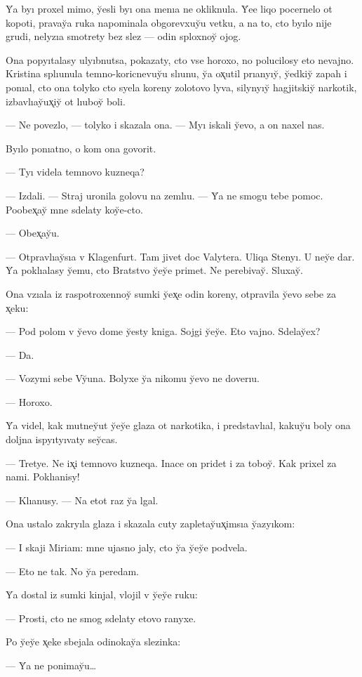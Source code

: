 \documentclass[10pt]{book}
\begin{document}
Y̆a byı proxel mimo, y̆esli byı ona menıa ne okliknula. Y̆ee liqo pocernelo ot kopoti, pravay̆a ruka napominala obgorevxuy̆u vetku, a na to, cto byılo nije grudi, nelyzıa smotrety bez slez — odin sploxnoy̆ ojog.

Ona popyıtalasy ulyıbnutsa, pokazaty, cto vse horoxo, no polucilosy eto nevajno. Kristina splıunula temno-koricnevuy̆u slıunu, y̆a ox̨util prıanyıy̆, y̆edkiy̆ zapah i ponıal, cto ona tolyko cto syela koreny zolotovo lyva, silynyıy̆ hagjitskiy̆ narkotik, izbavlıay̆ux̨iy̆ ot lıuboy̆ boli.

— Ne povezlo, — tolyko i skazala ona. — Myı iskali y̆evo, a on naxel nas.

Byılo ponıatno, o kom ona govorit.

— Tyı videla temnovo kuzneqa?

— Izdali. — Straj uronila golovu na zemlıu. — Y̆a ne smogu tebe pomoc. Poobex̨ay̆ mne sdelaty koy̆e-cto.

— Obex̨ay̆u.

— Otpravlıay̆sıa v Klagenfurt. Tam jivet doc Valytera. Uliqa Stenyı. U ney̆e dar. Y̆a poklıalasy y̆emu, cto Bratstvo y̆ey̆e primet. Ne perebivay̆. Sluxay̆.

Ona vzıala iz raspotroxennoy̆ sumki y̆ex̨e odin koreny, otpravila y̆evo sebe za x̨eku:

— Pod polom v y̆evo dome y̆esty kniga. Sojgi y̆ey̆e. Eto vajno. Sdelay̆ex?

— Da.

— Vozymi sebe Vy̆una. Bolyxe y̆a nikomu y̆evo ne doverıu.

— Horoxo.

Y̆a videl, kak mutney̆ut y̆ey̆e glaza ot narkotika, i predstavlıal, kakuy̆u boly ona doljna ispyıtyıvaty sey̆cas.

— Tretye. Ne ix̨i temnovo kuzneqa. Inace on pridet i za toboy̆. Kak prixel za nami. Poklıanisy!

— Klıanusy. — Na etot raz y̆a lgal.

Ona ustalo zakryıla glaza i skazala cuty zapletay̆ux̨imsıa y̆azyıkom:

— I skaji Miriam: mne ujasno jaly, cto y̆a y̆ey̆e podvela.

— Eto ne tak. No y̆a peredam.

Y̆a dostal iz sumki kinjal, vlojil v y̆ey̆e ruku:

— Prosti, cto ne smog sdelaty etovo ranyxe.

Po y̆ey̆e x̨eke sbejala odinokay̆a slezinka:

— Y̆a ne ponimay̆u…
\end{document}
